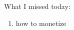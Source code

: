 What I missed today: 

\begin{enumerate}
	\item how to monetize
\end{enumerate}






























